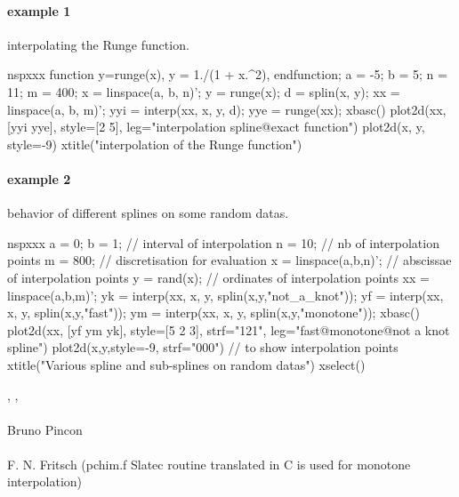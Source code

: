   \begin{examples}
\paragraph{example 1} interpolating the Runge function.
\begin{mintednsp}{nspxxx}
function y=runge(x), y = 1./(1 + x.^2), endfunction;
a = -5; b = 5; n = 11; m = 400;
x = linspace(a, b, n)';
y = runge(x);
d = splin(x, y);
xx = linspace(a, b, m)';
yyi = interp(xx, x, y, d);
yye = runge(xx);
xbasc()
plot2d(xx, [yyi yye], style=[2 5], leg="interpolation spline@exact function")
plot2d(x, y, style=-9)
xtitle("interpolation of the Runge function")
    \end{mintednsp}
\paragraph{example 2} behavior of different splines on some random datas.
 \begin{mintednsp}{nspxxx}
a = 0; b = 1;        // interval of interpolation
n = 10;              // nb of interpolation  points
m = 800;             // discretisation for evaluation
x = linspace(a,b,n)'; // abscissae of interpolation points
y = rand(x);          // ordinates of interpolation points
xx = linspace(a,b,m)';
yk = interp(xx, x, y, splin(x,y,"not_a_knot"));
yf = interp(xx, x, y, splin(x,y,"fast"));
ym = interp(xx, x, y, splin(x,y,"monotone"));
xbasc()
plot2d(xx, [yf ym yk], style=[5 2 3], strf="121", leg="fast@monotone@not a knot spline")
plot2d(x,y,style=-9, strf="000")  // to show interpolation points
xtitle("Various spline and sub-splines on random datas")
xselect()
\end{mintednsp}

  \end{examples}


  \begin{manseealso}
, , 
  \end{manseealso}


  \begin{authors}
	\paragraph{} Bruno Pincon
	\paragraph{} F. N. Fritsch (pchim.f Slatec routine translated
	in C is used for monotone interpolation) 
  \end{authors}

